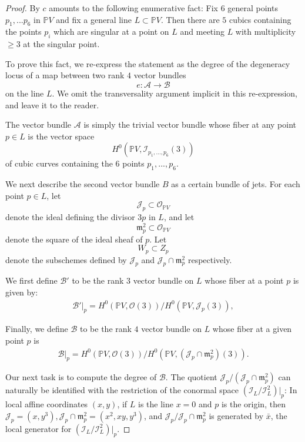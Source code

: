 \documentclass[12 pt, reqno]{amsart}
\theoremstyle{definition}
\newcommand{\mb}{\mathbb}
\newcommand{\mc}{\mathcal}
\renewcommand{\P}{\mb{P}}
\begin{document}
\begin{proof}
  By  $c$ amounts to the following
  enumerative fact: Fix $6$ general points $p_{1}, ... p_{6}$ in
  $\P V$ and fix a general line $L \subset \P V$.  Then there are $5$
  cubics containing the points $p_{i}$ which are singular at a point
  on $L$ and meeting $L$ with multiplicity $\geq 3$ at the singular
  point.

  To prove this fact, we re-express the statement as the degree of the
  degeneracy locus of a map between two rank $4$ vector bundles
  \[e: \mathcal{A} \to \mathcal{B}\] on the line $L$. We omit the
  transversality argument implicit in this re-expression, and leave it
  to the reader.

  The vector bundle $\mathcal{A}$ is simply the trivial vector bundle
  whose fiber at any point $p \in L$ is the vector space
  \[H^{0}\left(\P V, \mc{I}_{p_1, \ldots, p_{6}}(3)\right)\] of cubic
  curves containing the $6$ points $p_{1}, ..., p_{6}$.

  We next describe the second vector bundle $B$ as a certain bundle of
  jets.  For each point $p \in L$, let
  \[\mc{J}_{p} \subset \mc{O}_{\mb{P}V}\] denote the ideal defining
  the divisor $3p$ in $L$, and let
  \[\mathfrak{m}^{2}_{p} \subset \mathcal{O}_{\mb{P}V}\] denote the
  square of the ideal sheaf of $p$. Let \[W_{p} \subset Z_{p}\] denote
  the subschemes defined by $\mc{J}_{p}$ and
  $\mc{J}_{p} \cap \mathfrak{m}^{2}_{p}$ respectively.

  We first define $\mathcal{B}'$ to be the rank $3$ vector bundle on
  $L$ whose fiber at a point $p$ is given by:
  \begin{align*}
  \mathcal{B}'|_{p} = H^{0}(\P V, \mc{O}(3))/H^{0}(\P V, \mathcal{J}_{p}(3)),
\end{align*}

Finally, we define $\mathcal{B}$ to be the rank $4$ vector bundle on
$L$ whose fiber at a given point $p$ is
\begin{align*}
  \mc{B}|_{p} = H^{0}(\P V, \mc{O}(3))/H^{0}(\P V, (\mathcal{J}_{p} \cap \mathfrak{m}_{p}^{2})(3)).
\end{align*}

Our next task is to compute the degree of $\mathcal{B}$.  The quotient
$\mc{J}_{p}/\left(\mc{J}_{p} \cap \mathfrak{m}^{2}_{p}\right) $ can
naturally be identified with the restriction of the conormal space
$\left(\mc{I}_{L}/\mc{I}_{L}^{2}\right)|_{p}$: In local affine
coordinates $(x,y)$, if $L$ is the line $x=0$ and $p$ is the origin,
then
$\mc{J}_{p} = (x,y^{3}), \mc{J}_{p} \cap \mathfrak{m}^{2}_{p} =
(x^{2},xy,y^{3})$, and
$\mc{J}_{p}/\mc{J}_{p} \cap \mathfrak{m}^{2}_{p}$ is generated by
$\bar{x}$, the local generator for
$\left(\mc{I}_{L}/\mc{I}_{L}^{2}\right)|_{p}$.


\end{proof}
\end{document}
